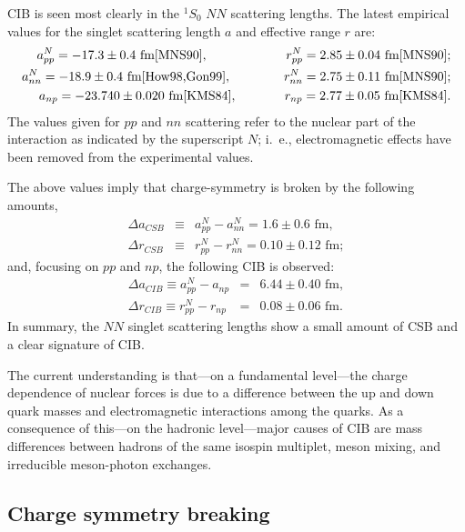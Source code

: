 CIB is seen most clearly in the $^1S_0$ 
$NN$ scattering lengths. 
The latest empirical values for the singlet scattering length $a$ 
and effective range $r$ are:
\begin{eqnarray}
a^N_{pp}=-17.3\pm 0.4 \mbox{ fm} \cite{MNS90}, \hspace*{.8cm} 
    &\hspace*{1.0cm}
    & r^N_{pp}=2.85\pm 0.04 \mbox{ fm} \cite{MNS90}; \\
a^N_{nn}=-18.9\pm 0.4 \mbox{ fm} \cite{How98,Gon99}, \hspace*{.16cm}
   && r^N_{nn} = 2.75\pm 0.11 \mbox{ fm} \cite{MNS90};\\
a_{np}=-23.740\pm 0.020 \mbox{ fm} \cite{KMS84}, 
    && r_{np}=2.77\pm 0.05 \mbox{ fm} \cite{KMS84}.
\end{eqnarray}
The values given for $pp$ and $nn$ 
scattering refer to the nuclear part of the interaction
as indicated by the superscript $N$; i.~e., 
electromagnetic effects have been removed from the experimental
values. 

The above values imply that
charge-symmetry is broken by the following amounts,
\begin{eqnarray}
\Delta a_{CSB}& \equiv& a_{pp}^N-a_{nn}^N = 1.6\pm 0.6 \mbox{ fm}, 
\label{eq_CSBlep1}
\\
\Delta r_{CSB}& \equiv& r_{pp}^N-r_{nn}^N = 0.10\pm 0.12 \mbox{ fm}; 
\label{eq_CSBlep2}
\end{eqnarray}
and, focusing on $pp$ and $np$,
the following CIB is observed:
\begin{eqnarray}
\Delta a_{CIB} \equiv
 a_{pp}^N
 - 
 a_{np}
 &=& 6.44\pm 0.40 \mbox{ fm},
\label{eq_CIBlep1}
\\
\Delta r_{CIB} \equiv
 r_{pp}^N
 - 
 r_{np}
 &=& 0.08\pm 0.06 \mbox{ fm}.
\label{eq_CIBlep2}
\end{eqnarray}
In summary, the $NN$ singlet scattering lengths show a small amount
of CSB and a clear signature of CIB.


The current understanding is 
that---on a fundamental level---the 
charge dependence of nuclear forces is due to
a difference between the up and down quark masses and electromagnetic 
interactions among the quarks. 
As a consequence of this---on the hadronic level---major
causes of CIB are mass differences between hadrons of the same
isospin multiplet, meson mixing, and irreducible meson-photon exchanges.



\subsection{Charge symmetry breaking}

